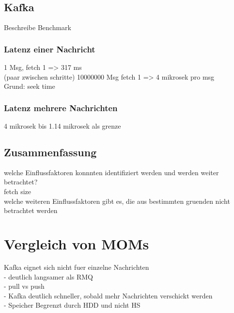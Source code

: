 \subsection{Kafka}
Beschreibe Benchmark
\subsubsection{Latenz einer Nachricht}
1 Msg, fetch 1 => 317 ms \\
(paar zwischen schritte)
10000000 Msg fetch 1 => 4 mikrosek pro msg\\

Grund: seek time
\subsubsection{Latenz mehrere Nachrichten}
4 mikrosek bis 1.14 mikrosek als grenze \\

\subsection{Zusammenfassung}
welche Einflussfaktoren konnnten identifiziert werden und werden weiter betrachtet? \\
fetch size \\
welche weiteren Einflussfaktoren gibt es, die aus bestimmten gruenden nicht betrachtet werden \\
\section{Vergleich von MOMs}
Kafka eignet sich nicht fuer einzelne Nachrichten \\
- deutlich langsamer als RMQ \\
- pull vs push \\
- Kafka deutlich schneller, sobald mehr Nachrichten verschickt werden \\
- Speicher Begrenzt durch HDD und nicht HS \\



